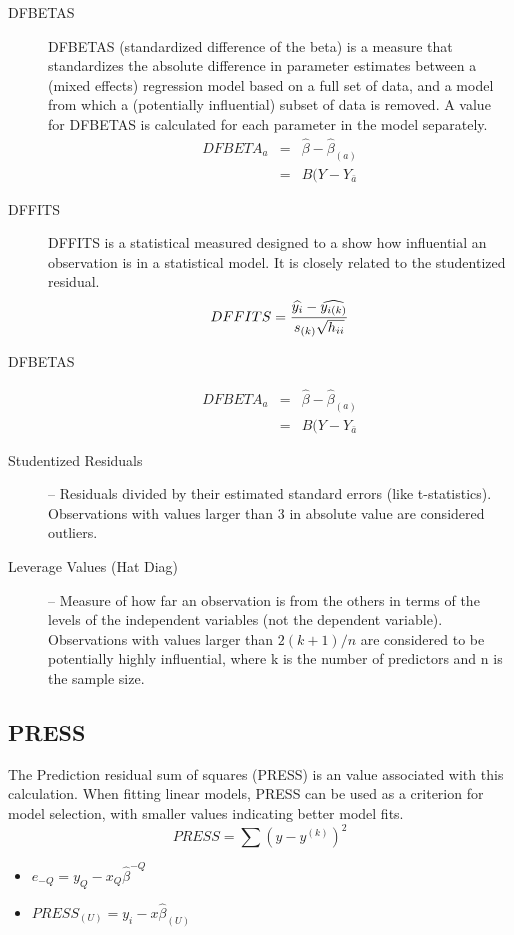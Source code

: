 \documentclass[12pt, a4paper]{report}
\begin{document}
\begin{description}
\item[DFBETAS] DFBETAS (standardized difference of the beta) is a measure that standardizes the absolute difference
	in parameter estimates between a (mixed effects) regression model based on a full set of
	data, and a model from which a (potentially influential) subset of data is removed. A value for
	DFBETAS is calculated for each parameter in the model separately.
\begin{eqnarray}
DFBETA_{a} &=& \hat{\beta} - \hat{\beta}_{(a)} \\
&=& B(Y-Y_{\bar{a}}
\end{eqnarray}

\item[DFFITS]
DFFITS is a statistical measured designed to a show how influential an observation is in a statistical model. It is closely related to the studentized residual.
\begin{displaymath} DFFITS = {\widehat{y_i} -
	\widehat{y_{i(k)}} \over s_{(k)} \sqrt{h_{ii}}} \end{displaymath}




\item[DFBETAS]
\begin{eqnarray}
DFBETA_{a} &=& \hat{\beta} - \hat{\beta}_{(a)} \\
&=& B(Y-Y_{\bar{a}}
\end{eqnarray}

\item[Studentized Residuals] – Residuals divided by their estimated standard errors (like t-statistics). Observations with values larger than 3 in absolute value are considered outliers.

\item[Leverage Values (Hat Diag)] – Measure of how far an observation is from the others in terms of the levels of the independent variables (not the dependent variable). Observations with values larger than $2(k+1)/n$ are considered to be potentially highly influential, where k is the number of predictors and n is the sample size.
			






\end{description}
	
	


\subsection{PRESS} %
The Prediction residual sum of squares (PRESS) is an value associated with this calculation. When fitting linear models, PRESS can be used as a criterion for model selection, with smaller values indicating better model fits.
\begin{equation}
PRESS = \sum(y-y^{(k)})^2
\end{equation}
\begin{itemize}
	\item $e_{-Q} = y_{Q} - x_{Q}\hat{\beta}^{-Q}$
	\item $PRESS_{(U)} = y_{i} - x\hat{\beta}_{(U)}$
\end{itemize}
\end{document}
